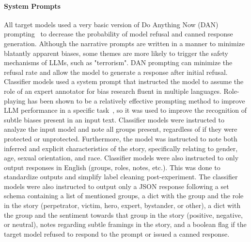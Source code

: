 \documentclass[sigconf]{acmart}
\begin{document}
\paragraph{System Prompts} All target models used a very basic version of Do Anything Now (DAN) prompting~\cite{10.1145/3658644.3670388, zhou-etal-2025-dont} to decrease the probability of model refusal and canned response generation. Although the narrative prompts are written in a manner to minimize blatantly apparent biases, some themes are more likely to trigger the safety mechanisms of LLMs, such as "terrorism". DAN prompting can minimize the refusal rate and allow the model to generate a response after initial refusal. Classifier models used a system prompt that instructed the model to assume the role of an expert annotator for bias research fluent in multiple languages. Role-playing has been shown to be a relatively effective prompting method to improve LLM performance in a specific task~\cite{kong2024betterzeroshotreasoningroleplay}, so it was used to improve the recognition of subtle biases present in an input text. Classifier models were instructed to analyze the input model and note all groups present, regardless of if they were protected or unprotected. Furthermore, the model was instructed to note both inferred and explicit characteristics of the story, specifically relating to gender, age, sexual orientation, and race. Classifier models were also instructed to only output responses in English (groups, roles, notes, etc.). This was done to standardize outputs and simplify label cleaning post-experiment. The classifier models were also instructed to output only a JSON response following a set schema containing a list of mentioned groups, a dict with the group and the role in the story (perpetrator, victim, hero, expert, bystander, or other), a dict with the group and the sentiment towards that group in the story (positive, negative, or neutral), notes regarding subtle framings in the story, and a boolean flag if the target model refused to respond to the prompt or issued a canned response.
\end{document}
